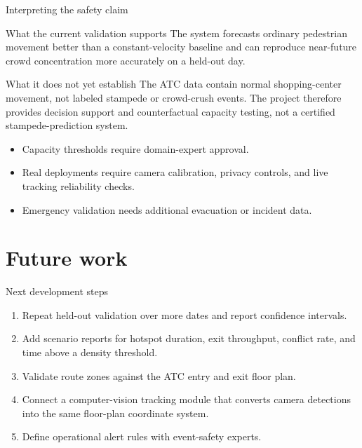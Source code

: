\documentclass[aspectratio=169]{beamer}
\begin{document}
\begin{frame}{Interpreting the safety claim}
\begin{block}{What the current validation supports}
The system forecasts ordinary pedestrian movement better than a constant-velocity baseline and can reproduce near-future crowd concentration more accurately on a held-out day.
\end{block}
\begin{alertblock}{What it does not yet establish}
The ATC data contain normal shopping-center movement, not labeled stampede or crowd-crush events. The project therefore provides decision support and counterfactual capacity testing, not a certified stampede-prediction system.
\end{alertblock}
\begin{itemize}
\item Capacity thresholds require domain-expert approval.
\item Real deployments require camera calibration, privacy controls, and live tracking reliability checks.
\item Emergency validation needs additional evacuation or incident data.
\end{itemize}
\end{frame}

\section{Future work}
\begin{frame}{Next development steps}
\begin{enumerate}
\item Repeat held-out validation over more dates and report confidence intervals.
\item Add scenario reports for hotspot duration, exit throughput, conflict rate, and time above a density threshold.
\item Validate route zones against the ATC entry and exit floor plan.
\item Connect a computer-vision tracking module that converts camera detections into the same floor-plan coordinate system.
\item Define operational alert rules with event-safety experts.
\end{enumerate}
\end{frame}
\end{document}
